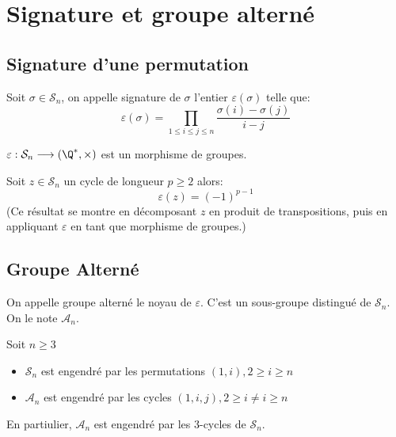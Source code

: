 
\section{Signature et groupe alterné}
\subsection{Signature d'une permutation}

\begin{definition}[Signature]
		Soit $\sigma \in \mathcal{S}_n$, on appelle signature de $\sigma$ l'entier $\varepsilon (\sigma)$ telle que:
			\[ \varepsilon(\sigma) = \prod_{1\leq i \le j \leq n} \frac{\sigma(i) - \sigma(j)}{i-j} \]
\end{definition}

\begin{prop}
		$\varepsilon : \mathcal{S}_n \longrightarrow (\Q^*, \times)$ est un morphisme de groupes.
\end{prop}

\begin{prop}
	Soit $z \in \mathcal{S}_n$ un cycle de longueur $p \geq 2$ alors:
		\[ \varepsilon(z) = {(-1)}^{p-1} \]
	(Ce résultat se montre en décomposant $z$ en produit de transpositions, puis en appliquant $\varepsilon$ en tant que morphisme de groupes.)
\end{prop}

\subsection{Groupe Alterné}

\begin{definition}
	On appelle groupe alterné le noyau de $\varepsilon$. C'est un sous-groupe distingué de $\mathcal{S}_n$.
	On le note $\mathcal{A}_n$.
\end{definition}

\begin{prop}
	Soit $n \geq 3$
	\begin{itemize}
		\item $\mathcal{S}_n$ est engendré par les permutations $(1,i), 2 \geq i \geq n$ 
		\item $\mathcal{A}_n$ est engendré par les cycles $(1,i,j), 2 \geq i \not = i \geq n $
	\end{itemize}
	En partiulier, $\mathcal{A}_n$ est engendré par les 3-cycles de $\mathcal{S}_n$.
\end{prop}
